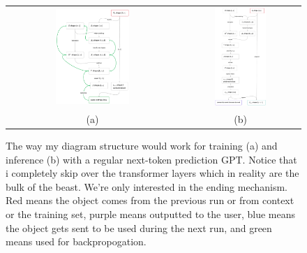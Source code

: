 \documentclass{article}
\begin{document}
\begin{figure}[!htb]
    \centering
    \begin{tabular}{cc}
        \includegraphics[width=0.45\textwidth]{NTP_train.png} & \includegraphics[width=0.45\textwidth]{NTP_inf.png} \\
        (a) & (b)
    \end{tabular}
    
    \caption{The way my diagram structure would work for training (a) and inference (b) with a regular next-token prediction GPT. Notice that i completely skip over the transformer layers which in reality are the bulk of the beast. We're only interested in the ending mechanism. Red means the object comes from the previous run or from context or the training set, purple means outputted to the user, blue means the object gets sent to be used during the next run, and green means used for backpropogation.}
    \label{fig:enter-label}
\end{figure}
\end{document}
